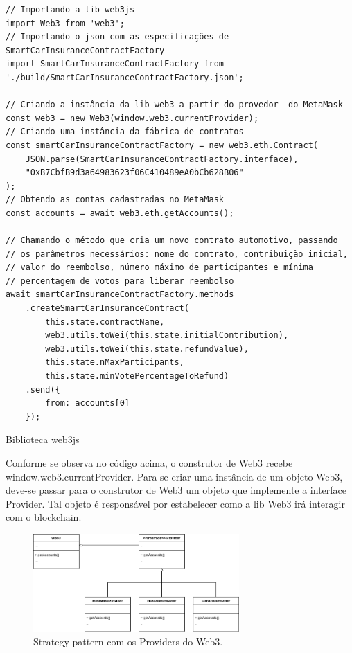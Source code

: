 \begin{code}
\begin{verbatim}
// Importando a lib web3js
import Web3 from 'web3'; 
// Importando o json com as especificações de SmartCarInsuranceContractFactory
import SmartCarInsuranceContractFactory from 
'./build/SmartCarInsuranceContractFactory.json';

// Criando a instância da lib web3 a partir do provedor  do MetaMask
const web3 = new Web3(window.web3.currentProvider);
// Criando uma instância da fábrica de contratos
const smartCarInsuranceContractFactory = new web3.eth.Contract(
    JSON.parse(SmartCarInsuranceContractFactory.interface),
    "0xB7CbfB9d3a64983623f06C410489eA0bCb628B06"
);
// Obtendo as contas cadastradas no MetaMask
const accounts = await web3.eth.getAccounts();

// Chamando o método que cria um novo contrato automotivo, passando
// os parâmetros necessários: nome do contrato, contribuição inicial,
// valor do reembolso, número máximo de participantes e mínima
// percentagem de votos para liberar reembolso
await smartCarInsuranceContractFactory.methods
	.createSmartCarInsuranceContract(
		this.state.contractName,
      	web3.utils.toWei(this.state.initialContribution),
      	web3.utils.toWei(this.state.refundValue),
      	this.state.nMaxParticipants,
      	this.state.minVotePercentageToRefund)
  	.send({
  		from: accounts[0]
	});
\end{verbatim}
\caption{Biblioteca web3js}
\label{lst:lib_web3js}
\end{code}

Conforme se observa no código acima, o construtor de Web3 recebe window.web3.currentProvider. Para se criar uma instância de um objeto Web3, deve-se passar para o construtor de Web3 um objeto que implemente a interface Provider. Tal objeto é responsável por estabelecer como a lib Web3 irá interagir com o blockchain.

\begin{figure}[h]
\centering
\includegraphics[width=0.7\textwidth]{Cap2/providers.png}
\caption{Strategy pattern com os Providers do Web3.}
\label{providers}
\end{figure}

